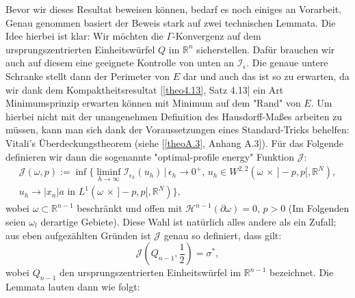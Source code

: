 Bevor wir dieses Resultat beweisen können, bedarf es noch einiges an Vorarbeit. Genau genommen basiert der Beweis stark auf zwei technischen Lemmata. Die Idee hierbei ist klar: Wir möchten die \(\Gamma\)-Konvergenz auf dem ursprungszentrierten Einheitswürfel \(Q\) im \(\mathbb{R}^n\) sicherstellen. Dafür brauchen wir auch auf diesem eine geeignete Kontrolle von unten an \(\mathcal{I}_{\epsilon}\). Die genaue untere Schranke stellt dann der Perimeter von \(E\) dar und auch das ist so zu erwarten, da wir dank dem Kompaktheitsresultat [\ref{theo4.13}, Satz 4.13] ein Art Minimumsprinzip erwarten können mit Minimum auf dem "Rand" von \(E\). Um hierbei nicht mit der unangenehmen Definition des Hausdorff-Maßes arbeiten zu müssen, kann man sich dank der Voraussetzungen eines Standard-Tricks behelfen: Vitali's Überdeckungstheorem (siehe [\ref{theoA.3}, Anhang A.3]). Für das Folgende definieren wir dann die sogenannte "optimal-profile energy" Funktion \(\mathcal{J}\):
\begin{equation}
\begin{array}{l}
    \mathcal{J}(\omega,p) := \inf \{\liminf_{h \to \infty} \mathcal{I}_{\epsilon_h} (u_h) \, | \, \epsilon_h \to 0^+, \, u_h \in W^{2,2}(\omega \, \times \, ]-p,p[, \mathbb{R}^N), \\
    u_h \to |x_n|a \text{ in }L^1(\omega \, \times \, ]-p,p[, \mathbb{R}^N)\},
\end{array}
\end{equation}
wobei \(\omega \subset \mathbb{R}^{n-1}\) beschränkt und offen mit \(\mathcal{H}^{n-1}(\partial \omega) = 0, \, p > 0\) (Im Folgenden seien \(\omega_l\) derartige Gebiete). Diese Wahl ist natürlich alles andere als ein Zufall; aus eben aufgezählten Gründen ist \(\mathcal{J}\) genau so definiert, dass gilt:
\begin{equation}
    \mathcal{J}(Q_{n-1},\frac{1}{2}) = \sigma^*,
\end{equation}
wobei \(Q_{n-1}\) den ursprungszentrierten Einheitswürfel im \(\mathbb{R}^{n-1}\) bezeichnet. Die Lemmata lauten dann wie folgt:\\[0.5cm]
